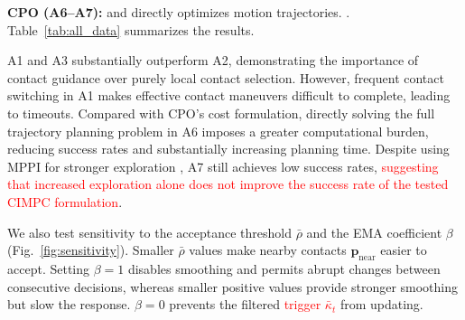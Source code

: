 \textbf{CPO (A6--A7):}   and directly optimizes motion trajectories.
 .   Table~\ref{tab:all_data} summarizes the results.

A1 and A3 substantially outperform A2, demonstrating the importance of contact guidance over purely local contact selection. However, frequent contact switching in A1 makes effective contact maneuvers difficult to complete, leading to timeouts.    Compared with CPO's cost formulation, directly solving the full trajectory planning problem in A6 imposes a greater computational burden, reducing success rates and substantially increasing planning time. Despite using MPPI for stronger exploration  , A7 still achieves low success rates, \textcolor{red}{suggesting that increased exploration alone does not improve the success rate of the tested CIMPC formulation}.

We also test sensitivity to the acceptance threshold $\bar{\rho}$ and the EMA coefficient $\beta$ (Fig.~\ref{fig:sensitivity}).  Smaller $\bar{\rho}$ values make nearby contacts $\boldsymbol{p}_{\text{near}}$ easier to accept. Setting $\beta=1$ disables smoothing and permits abrupt changes between consecutive decisions, whereas smaller positive values provide stronger smoothing but slow the response. $\beta=0$ prevents the filtered \textcolor{red}{trigger $\bar{\kappa}_t$} from updating.  

